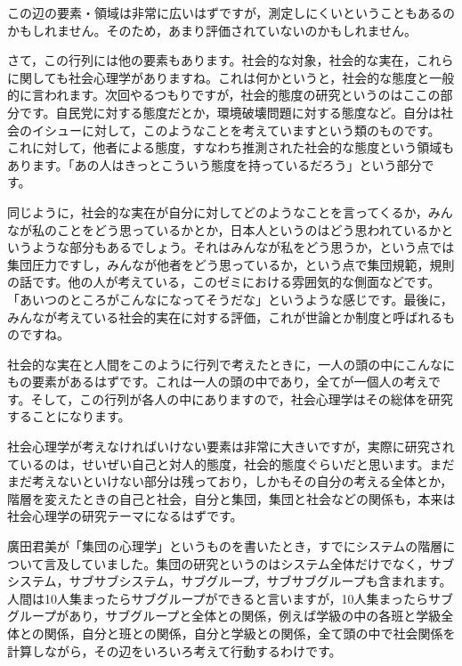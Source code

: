 \documentclass{ltjsbook}
\begin{document}
この辺の要素・領域は非常に広いはずですが，測定しにくいということもあるのかもしれません。そのため，あまり評価されていないのかもしれません。

さて，この行列には他の要素もあります。社会的な対象，社会的な実在，これらに関しても社会心理学がありますね。これは何かというと，社会的な態度と一般的に言われます。次回やるつもりですが，社会的態度の研究というのはここの部分です。自民党に対する態度だとか，環境破壊問題に対する態度など。自分は社会のイシューに対して，このようなことを考えていますという類のものです。
これに対して，他者による態度，すなわち推測された社会的な態度という領域もあります。「あの人はきっとこういう態度を持っているだろう」という部分です。

同じように，社会的な実在が自分に対してどのようなことを言ってくるか，みんなが私のことをどう思っているかとか，日本人というのはどう思われているかというような部分もあるでしょう。それはみんなが私をどう思うか，という点では集団圧力ですし，みんなが他者をどう思っているか，という点で集団規範，規則の話です。他の人が考えている，このゼミにおける雰囲気的な側面などです。「あいつのところがこんなになってそうだな」というような感じです。最後に，みんなが考えている社会的実在に対する評価，これが世論とか制度と呼ばれるものですね。

社会的な実在と人間をこのように行列で考えたときに，一人の頭の中にこんなにもの要素があるはずです。これは一人の頭の中であり，全てが一個人の考えです。そして，この行列が各人の中にありますので，社会心理学はその総体を研究することになります。

社会心理学が考えなければいけない要素は非常に大きいですが，実際に研究されているのは，せいぜい自己と対人的態度，社会的態度ぐらいだと思います。まだまだ考えないといけない部分は残っており，しかもその自分の考える全体とか，階層を変えたときの自己と社会，自分と集団，集団と社会などの関係も，本来は社会心理学の研究テーマになるはずです。

廣田君美が「集団の心理学」\parencite{HirotaKimiyoshi}というものを書いたとき，すでにシステムの階層について言及していました。集団の研究というのはシステム全体だけでなく，サブシステム，サブサブシステム，サブグループ，サブサブグループも含まれます。人間は10人集まったらサブグループができると言いますが，10人集まったらサブグループがあり，サブグループと全体との関係，例えば学級の中の各班と学級全体との関係，自分と班との関係，自分と学級との関係，全て頭の中で社会関係を計算しながら，その辺をいろいろ考えて行動するわけです。
\end{document}
